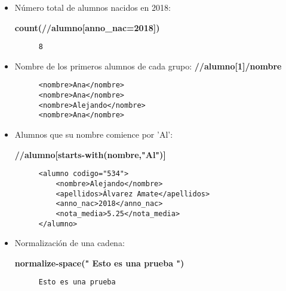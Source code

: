 \begin{itemize}
    \item Número total de alumnos nacidos en 2018:

    \textbf{count(//alumno[anno\_nac=2018])}

    \begin{figure}[h]
        \begin{tcolorbox}[sharp corners, colback=yellow!30, colframe=white!20]
            \scriptsize
            \begin{verbatim}
8
            \end{verbatim}
        \end{tcolorbox}
    \end{figure}

    \item Nombre de los primeros alumnos de cada grupo: \textbf{//alumno[1]/nombre}
    \begin{figure}[h]
    \begin{tcolorbox}[sharp corners, colback=yellow!30, colframe=white!20]
        \scriptsize
        \begin{verbatim}
<nombre>Ana</nombre>
<nombre>Ana</nombre>
<nombre>Alejando</nombre>
<nombre>Ana</nombre>
        \end{verbatim}
    \end{tcolorbox}
\end{figure}

    \item Alumnos que su nombre comience por 'Al':

    \textbf{//alumno[starts-with(nombre,"Al")]}
    \begin{figure}[h]
    \begin{tcolorbox}[sharp corners, colback=yellow!30, colframe=white!20]
        \scriptsize
        \begin{verbatim}
<alumno codigo="534">
    <nombre>Alejando</nombre>
    <apellidos>Álvarez Amate</apellidos>
    <anno_nac>2018</anno_nac>
    <nota_media>5.25</nota_media>
</alumno>
        \end{verbatim}
    \end{tcolorbox}
\end{figure}

    \item Normalización de una cadena:

    \textbf{normalize-space(" Esto    es      una   prueba  ")}
    \begin{figure}[H]
    \begin{tcolorbox}[sharp corners, colback=yellow!30, colframe=white!20]
        \scriptsize
        \begin{verbatim}
Esto es una prueba
        \end{verbatim}
    \end{tcolorbox}
\end{figure}


\end{itemize}
